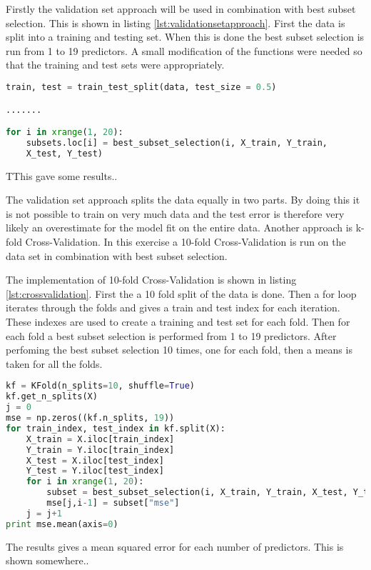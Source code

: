 Firstly the validation set approach will be used in combination with best subset selection. This is shown in listing \ref{lst:validationsetapproach}. First the data is split into a training and testing set. When this is done the best subset selection is run from 1 to 19 predictors. A small modification of the functions were needed so that the training and test sets were appropriately.

\begin{lstlisting}[language=Python, label=lst:validationsetapproach, caption=Validation set approach for choosing predictors]
train, test = train_test_split(data, test_size = 0.5)

.......

for i in xrange(1, 20):
	subsets.loc[i] = best_subset_selection(i, X_train, Y_train,
	X_test, Y_test)
\end{lstlisting}

TThis gave some results.. 

The validation set approach splits the data equally in two parts. By doing this it is not possible to train on very much data and the test error is therefore very likely an overestimate for the model fit on the entire data. Another approach is k-fold Cross-Validation. In this exercise a 10-fold Cross-Validation is run on the data set in combination with best subset selection.

The implementation of 10-fold Cross-Validation is shown in listing \ref{lst:crossvalidation}. First the a 10 fold split of the data is done. Then a for loop iterates through the folds and gives a train and test index for each iteration. These indexes are used to create a training and test set for each fold. Then for each fold a best subset selection is performed from 1 to 19 predictors. After perfoming the best subset selection 10 times, one for each fold, then a means is taken for all the folds.

\begin{lstlisting}[language=Python, label=lst:crossvalidation, caption=Cross-validation and best subset selection for choosing predictors]
kf = KFold(n_splits=10, shuffle=True)
kf.get_n_splits(X)
j = 0
mse = np.zeros((kf.n_splits, 19))
for train_index, test_index in kf.split(X):
    X_train = X.iloc[train_index]
    Y_train = Y.iloc[train_index]
    X_test = X.iloc[test_index]
    Y_test = Y.iloc[test_index]
    for i in xrange(1, 20):
		subset = best_subset_selection(i, X_train, Y_train, X_test, Y_test)
        mse[j,i-1] = subset["mse"]
    j = j+1
print mse.mean(axis=0)    
\end{lstlisting}

The results gives a mean squared error for each number of predictors. This is shown somewhere.. 